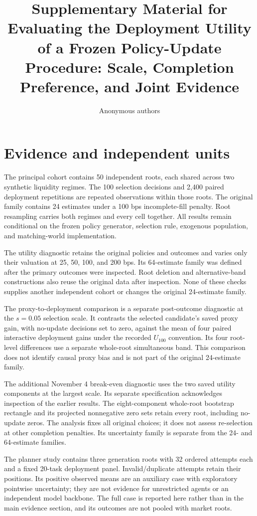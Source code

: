 \documentclass[10pt,letterpaper]{article}
\title{Supplementary Material for\\Evaluating the Deployment Utility of a Frozen Policy-Update Procedure: Scale, Completion Preference, and Joint Evidence}
\author{Anonymous authors}
\date{}
\begin{document}
\maketitle
\section{Evidence and independent units}
The principal cohort contains 50 independent roots, each shared across two synthetic liquidity regimes. The 100 selection decisions and 2,400 paired deployment repetitions are repeated observations within those roots. The original family contains 24 estimates under a 100 bps incomplete-fill penalty. Root resampling carries both regimes and every cell together. All results remain conditional on the frozen policy generator, selection rule, exogenous population, and matching-world implementation.

The utility diagnostic retains the original policies and outcomes and varies only their valuation at 25, 50, 100, and 200 bps. Its 64-estimate family was defined after the primary outcomes were inspected. Root deletion and alternative-band constructions also reuse the original data after inspection. None of these checks supplies another independent cohort or changes the original 24-estimate family.

The proxy-to-deployment comparison is a separate post-outcome diagnostic at the $s=0.05$ selection scale. It contrasts the selected candidate's saved proxy gain, with no-update decisions set to zero, against the mean of four paired interactive deployment gains under the recorded $U_{100}$ convention. Its four root-level differences use a separate whole-root simultaneous band. This comparison does not identify causal proxy bias and is not part of the original 24-estimate family.

The additional November 4 break-even diagnostic uses the two saved utility components at the largest scale. Its separate specification acknowledges inspection of the earlier results. The eight-component whole-root bootstrap rectangle and its projected nonnegative zero sets retain every root, including no-update zeros. The analysis fixes all original choices; it does not assess re-selection at other completion penalties. Its uncertainty family is separate from the 24- and 64-estimate families.

The planner study contains three generation roots with 32 ordered attempts each and a fixed 20-task deployment panel. Invalid/duplicate attempts retain their positions. Its positive observed means are an auxiliary case with exploratory pointwise uncertainty; they are not evidence for unrestricted agents or an independent model backbone. The full case is reported here rather than in the main evidence section, and its outcomes are not pooled with market roots.
\end{document}

